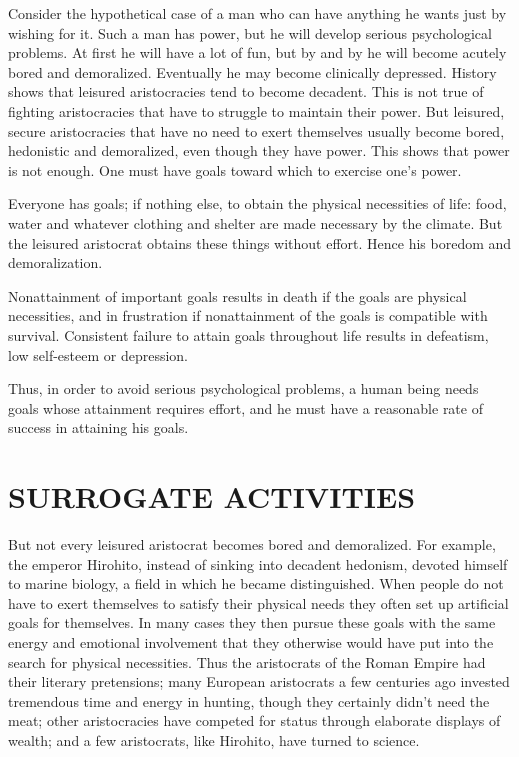  Consider the hypothetical case of a man who can have anything he wants just by wishing for it. Such a man has power, but he will develop serious psychological problems. At first he will have a lot of fun, but by and by he will become acutely bored and demoralized. Eventually he may become clinically depressed. History shows that leisured aristocracies tend to become decadent. This is not true of fighting aristocracies that have to struggle to maintain their power. But leisured, secure aristocracies that have no need to exert themselves usually become bored, hedonistic and demoralized, even though they have power. This shows that power is not enough. One must have goals toward which to exercise one’s power.

 Everyone has goals; if nothing else, to obtain the physical necessities of life: food, water and whatever clothing and shelter are made necessary by the climate. But the leisured aristocrat obtains these things without effort. Hence his boredom and demoralization.

 Nonattainment of important goals results in death if the goals are physical necessities, and in frustration if nonattainment of the goals is compatible with survival. Consistent failure to attain goals throughout life results in defeatism, low self-esteem or depression.

 Thus, in order to avoid serious psychological problems, a human being needs goals whose attainment requires effort, and he must have a reasonable rate of success in attaining his goals.

\chapter{SURROGATE ACTIVITIES}

 But not every leisured aristocrat becomes bored and demoralized. For example, the emperor Hirohito, instead of sinking into decadent hedonism, devoted himself to marine biology, a field in which he became distinguished. When people do not have to exert themselves to satisfy their physical needs they often set up artificial goals for themselves. In many cases they then pursue these goals with the same energy and emotional involvement that they otherwise would have put into the search for physical necessities. Thus the aristocrats of the Roman Empire had their literary pretensions; many European aristocrats a few centuries ago invested tremendous time and energy in hunting, though they certainly didn’t need the meat; other aristocracies have competed for status through elaborate displays of wealth; and a few aristocrats, like Hirohito, have turned to science.

